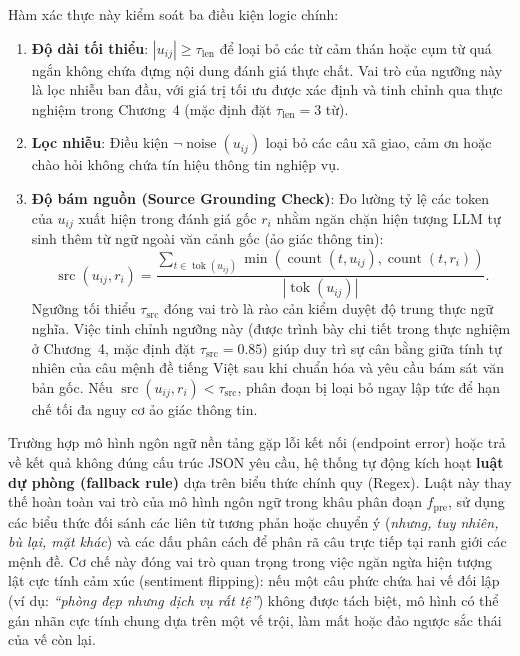 Hàm xác thực này kiểm soát ba điều kiện logic chính:
\begin{enumerate}[leftmargin=1.2cm]
    \item \textbf{Độ dài tối thiểu}: $|u_{ij}| \geq \tau_{\mathrm{len}}$ để loại bỏ các từ cảm thán hoặc cụm từ quá ngắn không chứa đựng nội dung đánh giá thực chất. Vai trò của ngưỡng này là lọc nhiễu ban đầu, với giá trị tối ưu được xác định và tinh chỉnh qua thực nghiệm trong Chương~4 (mặc định đặt $\tau_{\mathrm{len}} = 3$ từ).
    \item \textbf{Lọc nhiễu}: Điều kiện $\neg \operatorname{noise}(u_{ij})$ loại bỏ các câu xã giao, cảm ơn hoặc chào hỏi không chứa tín hiệu thông tin nghiệp vụ.
    \item \textbf{Độ bám nguồn (Source Grounding Check)}: Đo lường tỷ lệ các token của $u_{ij}$ xuất hiện trong đánh giá gốc $r_i$ nhằm ngăn chặn hiện tượng LLM tự sinh thêm từ ngữ ngoài văn cảnh gốc (ảo giác thông tin):
\begin{equation}
\operatorname{src}(u_{ij}, r_i) = \frac{\sum_{t \in \operatorname{tok}(u_{ij})} \min\left(\operatorname{count}(t, u_{ij}), \operatorname{count}(t, r_i)\right)}{|\operatorname{tok}(u_{ij})|}.
\label{eq:method1-source-precision}
\end{equation}
Ngưỡng tối thiểu $\tau_{\mathrm{src}}$ đóng vai trò là rào cản kiểm duyệt độ trung thực ngữ nghĩa. Việc tinh chỉnh ngưỡng này (được trình bày chi tiết trong thực nghiệm ở Chương~4, mặc định đặt $\tau_{\mathrm{src}} = 0.85$) giúp duy trì sự cân bằng giữa tính tự nhiên của câu mệnh đề tiếng Việt sau khi chuẩn hóa và yêu cầu bám sát văn bản gốc. Nếu $\operatorname{src}(u_{ij}, r_i) < \tau_{\mathrm{src}}$, phân đoạn bị loại bỏ ngay lập tức để hạn chế tối đa nguy cơ ảo giác thông tin.
\end{enumerate}

Trường hợp mô hình ngôn ngữ nền tảng gặp lỗi kết nối (endpoint error) hoặc trả về kết quả không đúng cấu trúc JSON yêu cầu, hệ thống tự động kích hoạt \textbf{luật dự phòng (fallback rule)} dựa trên biểu thức chính quy (Regex). Luật này thay thế hoàn toàn vai trò của mô hình ngôn ngữ trong khâu phân đoạn $f_{\mathrm{pre}}$, sử dụng các biểu thức đối sánh các liên từ tương phản hoặc chuyển ý (\textit{nhưng, tuy nhiên, bù lại, mặt khác}) và các dấu phân cách để phân rã câu trực tiếp tại ranh giới các mệnh đề. Cơ chế này đóng vai trò quan trọng trong việc ngăn ngừa hiện tượng lật cực tính cảm xúc (sentiment flipping): nếu một câu phức chứa hai vế đối lập (ví dụ: \textit{``phòng đẹp nhưng dịch vụ rất tệ''}) không được tách biệt, mô hình có thể gán nhãn cực tính chung dựa trên một vế trội, làm mất hoặc đảo ngược sắc thái của vế còn lại.

